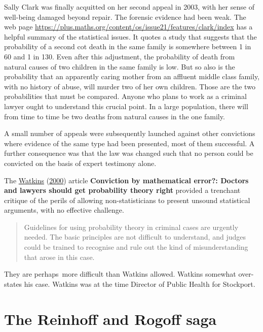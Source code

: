 \documentclass[
  10pt,
  b5paper]{book}
\begin{document}
Sally Clark was finally acquitted on her second appeal in
2003, with her sense of well-being damaged beyond repair.
The forensic evidence had been weak. The web page
\url{https://plus.maths.org/content/os/issue21/features/clark/index}
has a helpful summary of the statistical issues. It
quotes a study that suggests that the probability of a
second cot death in the same family is somewhere between 1
in 60 and 1 in 130. Even after this adjustment, the
probability of death from natural causes of two children in
the same family is low. But so also is the probability that
an apparently caring mother from an affluent middle class
family, with no history of abuse, will murder two of her own
children. Those are the two probabilities that must be
compared. Anyone who plans to work as a criminal lawyer
ought to understand this crucial point. In a
large population, there will from time to time be two deaths
from natural causes in the one family.

A small number of appeals were subsequently launched against
other convictions where evidence of the same type had been
presented, most of them successful. A further consequence
was that the law was changed such that no person could be
convicted on the basis of expert testimony alone.

The \protect\hyperlink{ref-watkins2000conviction}{Watkins} (\protect\hyperlink{ref-watkins2000conviction}{2000}) article \textbf{Conviction by mathematical
error?: Doctors and lawyers should get probability theory right}
provided a trenchant critique of the perils of allowing
non-statisticians to present unsound statistical arguments, with
no effective challenge.

\begin{quote}
Guidelines for using probability theory in criminal cases are urgently needed. The basic principles are not difficult to understand, and judges could be trained to recognise and rule out the kind of misunderstanding that arose in this case.
\end{quote}

They are perhaps~more difficult than Watkins allowed. Watkins
somewhat over-states his case. Watkins was at the time
Director of Public Health for Stockport.

\hypertarget{the-reinhoff-and-rogoff-saga}{%
\section{The Reinhoff and Rogoff saga}\label{the-reinhoff-and-rogoff-saga}}
\end{document}
